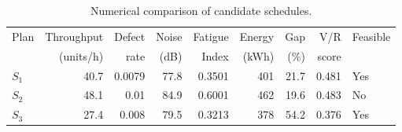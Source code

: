 \begin{table}[htbp]
\centering
\caption{Numerical comparison of candidate schedules.}
\label{tab:numerical-sim}
\small
\begin{tabular}{@{}lrrrrrrrl@{}}
\toprule
Plan & Throughput & Defect & Noise & Fatigue & Energy & Gap & V/R & Feasible \\
     & (units/h)  & rate   & (dB)  & Index   & (kWh)  & (\%) & score &         \\
\midrule
$S_{1}$ & 40.7 & 0.0079 & 77.8 & 0.3501 & 401 & 21.7 & 0.481 & Yes \\
$S_{2}$ & 48.1 & 0.01 & 84.9 & 0.6001 & 462 & 19.6 & 0.483 & No \\
$S_{3}$ & 27.4 & 0.008 & 79.5 & 0.3213 & 378 & 54.2 & 0.376 & Yes \\
\bottomrule
\end{tabular}
\end{table}
